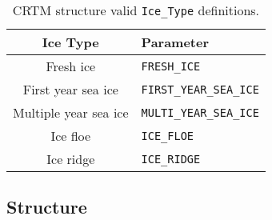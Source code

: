 \begin{table}[htp]
  \centering
  \begin{tabular}{c l}
    \hline
    \sffamily\textbf{Ice Type} & \sffamily\textbf{Parameter} \\
    \hline\hline
            Fresh ice        &   \texttt{FRESH\_ICE} \\       
        First year sea ice   &   \texttt{FIRST\_YEAR\_SEA\_ICE} \\
      Multiple year sea ice  &   \texttt{MULTI\_YEAR\_SEA\_ICE} \\
            Ice floe         &   \texttt{ICE\_FLOE} \\            
            Ice ridge        &   \texttt{ICE\_RIDGE} \\           
    \hline
  \end{tabular}
  \caption{CRTM \Surface{} structure valid \texttt{Ice\_Type} definitions.}
  \label{tab:surface_ice_type}
\end{table}

\clearpage













\clearpage
\subsection{\SensorData{} Structure}
\label{sec:sensordata_structure}



